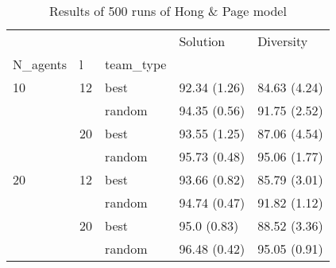 \begin{table}
\centering
\caption{Results of 500 runs of Hong & Page model}
\begin{tabular}{lllll}
\toprule
   &    &        &      Solution &     Diversity \\
N\_agents & l & team\_type &               &               \\
\midrule
10 & 12 & best &  92.34 (1.26) &  84.63 (4.24) \\
   &    & random &  94.35 (0.56) &  91.75 (2.52) \\
   & 20 & best &  93.55 (1.25) &  87.06 (4.54) \\
   &    & random &  95.73 (0.48) &  95.06 (1.77) \\
20 & 12 & best &  93.66 (0.82) &  85.79 (3.01) \\
   &    & random &  94.74 (0.47) &  91.82 (1.12) \\
   & 20 & best &   95.0 (0.83) &  88.52 (3.36) \\
   &    & random &  96.48 (0.42) &  95.05 (0.91) \\
\bottomrule
\end{tabular}
\end{table}
